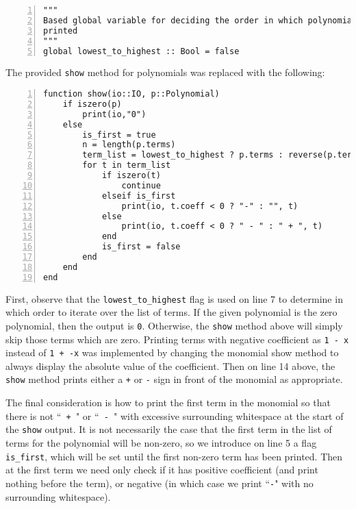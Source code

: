 \documentclass{article}
\theoremstyle{plain}
\numberwithin{theorem}{section}
\numberwithin{example}{section}
\theoremstyle{definition}
\numberwithin{definition}{section}
\begin{document}
\begin{codebox}[polynomial.jl]
    \begin{Verbatim}[numbers=left,xleftmargin=5mm]
"""
Based global variable for deciding the order in which polynomial terms are
printed
"""
global lowest_to_highest :: Bool = false

    \end{Verbatim}
\end{codebox}

The provided \texttt{show} method for polynomials was replaced with the
following:

\begin{codebox}[polynomial.jl]
    \begin{Verbatim}[numbers=left,xleftmargin=5mm]
function show(io::IO, p::Polynomial) 
    if iszero(p)
        print(io,"0")
    else
        is_first = true
        n = length(p.terms)
        term_list = lowest_to_highest ? p.terms : reverse(p.terms)
        for t in term_list
            if iszero(t)
                continue
            elseif is_first
                print(io, t.coeff < 0 ? "-" : "", t)
            else
                print(io, t.coeff < 0 ? " - " : " + ", t)
            end
            is_first = false
        end
    end
end
    \end{Verbatim}
\end{codebox}

First, observe that the \texttt{lowest\_to\_highest} flag is used on line 7 to
determine in which order to iterate over the list of terms. If the given
polynomial is the zero polynomial, then the output is \texttt{0}. Otherwise, the
\texttt{show} method above will simply skip those terms which are zero.
Printing terms with negative coefficient as \texttt{1 - x} instead of
\texttt{1 + -x} was implemented by changing the monomial show method to always
display the absolute value of the coefficient. Then on line 14 above, the
\texttt{show} method prints either a \texttt{+} or \texttt{-} sign in front of
the monomial as appropriate. \medbreak

The final consideration is how to print the first term in the monomial so that
there is not ``\texttt{ + }" or ``\texttt{ - }" with excessive surrounding
whitespace at the start of the \texttt{show} output. It is not necessarily the
case that the first term in the list of terms for the polynomial will be
non-zero, so we introduce on line 5 a flag \texttt{is\_first}, which will be set
until the first non-zero term has been printed. Then at the first term we need
only check if it has positive coefficient (and print nothing before the term),
or negative (in which case we print ``\texttt{-}" with no surrounding
whitespace). \medbreak
\end{document}
